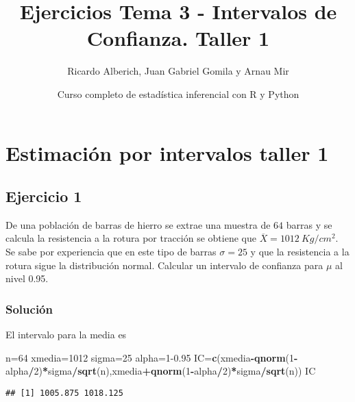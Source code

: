 \documentclass[
]{article}
\title{Ejercicios Tema 3 - Intervalos de Confianza. Taller 1}
\author{Ricardo Alberich, Juan Gabriel Gomila y Arnau Mir}
\date{Curso completo de estadística inferencial con R y Python}
\newenvironment{Shaded}{\begin{snugshade}}{\end{snugshade}}
\newcommand{\DecValTok}[1]{\textcolor[rgb]{0.00,0.00,0.81}{#1}}
\newcommand{\FloatTok}[1]{\textcolor[rgb]{0.00,0.00,0.81}{#1}}
\newcommand{\KeywordTok}[1]{\textcolor[rgb]{0.13,0.29,0.53}{\textbf{#1}}}
\newcommand{\NormalTok}[1]{#1}
\newcommand{\OperatorTok}[1]{\textcolor[rgb]{0.81,0.36,0.00}{\textbf{#1}}}
\begin{document}
\maketitle

{
\hypersetup{linkcolor=blue}
\setcounter{tocdepth}{4}
\tableofcontents
}
\hypertarget{estimaciuxf3n-por-intervalos-taller-1}{%
\section{Estimación por intervalos taller
1}\label{estimaciuxf3n-por-intervalos-taller-1}}

\hypertarget{ejercicio-1}{%
\subsection{Ejercicio 1}\label{ejercicio-1}}

De una población de barras de hierro se extrae una muestra de \(64\)
barras y se calcula la resistencia a la rotura por tracción se obtiene
que \(\overline{X}=1012\ Kg/cm^{2}\). Se sabe por experiencia que en
este tipo de barras \(\sigma=25\) y que la resistencia a la rotura sigue
la distribución normal. Calcular un intervalo de confianza para \(\mu\)
al nivel 0.95.

\hypertarget{soluciuxf3n}{%
\subsubsection{Solución}\label{soluciuxf3n}}

El intervalo para la media es

\begin{Shaded}
\begin{Highlighting}[]
\NormalTok{n=}\DecValTok{64}
\NormalTok{xmedia=}\DecValTok{1012}
\NormalTok{sigma=}\DecValTok{25}
\NormalTok{alpha=}\DecValTok{1}\FloatTok{{-}0.95}
\NormalTok{IC=}\KeywordTok{c}\NormalTok{(xmedia}\OperatorTok{{-}}\KeywordTok{qnorm}\NormalTok{(}\DecValTok{1}\OperatorTok{{-}}\NormalTok{alpha}\OperatorTok{/}\DecValTok{2}\NormalTok{)}\OperatorTok{*}\NormalTok{sigma}\OperatorTok{/}\KeywordTok{sqrt}\NormalTok{(n),xmedia}\OperatorTok{+}\KeywordTok{qnorm}\NormalTok{(}\DecValTok{1}\OperatorTok{{-}}\NormalTok{alpha}\OperatorTok{/}\DecValTok{2}\NormalTok{)}\OperatorTok{*}\NormalTok{sigma}\OperatorTok{/}\KeywordTok{sqrt}\NormalTok{(n))}
\NormalTok{IC}
\end{Highlighting}
\end{Shaded}

\begin{verbatim}
## [1] 1005.875 1018.125
\end{verbatim}
\end{document}
